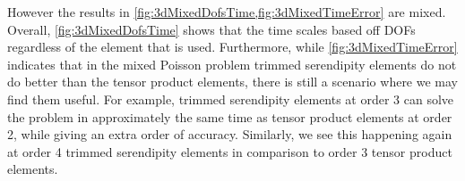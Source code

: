 \documentclass[format=acmsmall,screen,timestamp=false,a4paper]{acmart}
\newcommand\josh[1]{\textbf{\textcolor[rgb]{0,.5,1}{[Josh: #1]}}}
\newcommand\justin[1]{\textbf{\textcolor[rgb]{0,1,0.5}{[Justin: #1]}}}
\begin{document}
However the results in \cref{fig:3dMixedDofsTime,fig:3dMixedTimeError} are mixed.  Overall, \cref{fig:3dMixedDofsTime} shows that the time scales based off DOFs regardless of the element that is used.  Furthermore, while \cref{fig:3dMixedTimeError} indicates that in the mixed Poisson problem trimmed serendipity elements do not do better than the tensor product elements, there is still a scenario where we may find them useful.  For example, trimmed serendipity elements at order 3 can solve the problem in approximately the same time as tensor product elements at order 2, while giving an extra order of accuracy.  Similarly, we see this happening again at order 4 trimmed serendipity elements in comparison to order 3 tensor product elements.

\end{document}
